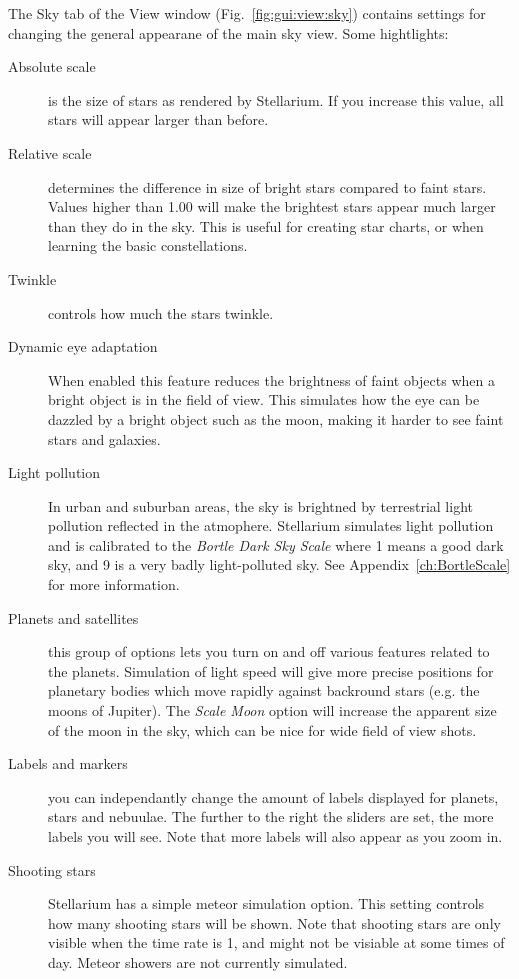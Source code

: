The Sky tab of the View window (Fig.~\ref{fig:gui:view:sky}) contains settings
for changing the general appearane of the main sky view. Some
hightlights:

\begin{description}
\item[Absolute scale] is the size of stars as rendered by
  Stellarium. If you increase this value, all stars will appear larger
  than before.
\item[Relative scale] determines the difference in size of bright
  stars compared to faint stars. Values higher than 1.00 will make the
  brightest stars appear much larger than they do in the sky. This is
  useful for creating star charts, or when learning the basic
  constellations.
\item[Twinkle] controls how much the stars twinkle.
\item[Dynamic eye adaptation] When enabled this feature reduces the
  brightness of faint objects when a bright object is in the field of
  view. This simulates how the eye can be dazzled by a bright object
  such as the moon, making it harder to see faint stars and galaxies.
\item[Light pollution] In urban and suburban areas, the sky is
  brightned by terrestrial light pollution reflected in the atmophere.
  Stellarium simulates light pollution and is calibrated to the
  \emph{Bortle Dark Sky Scale} where 1 means a good dark sky, and 9 is
  a very badly light-polluted sky. See Appendix~\ref{ch:BortleScale}
  for more information.
\item[Planets and satellites] this group of options lets you turn on
  and off various features related to the planets. Simulation of light
  speed will give more precise positions for planetary bodies which move
  rapidly against backround stars (e.g. the moons of Jupiter). The
  \emph{Scale Moon} option will increase the apparent size of the moon
  in the sky, which can be nice for wide field of view shots.
\item[Labels and markers] you can independantly change the amount of
  labels displayed for planets, stars and nebuulae. The further to the
  right the sliders are set, the more labels you will see. Note that
  more labels will also appear as you zoom in.
\item[Shooting stars] Stellarium has a simple meteor simulation
  option. This setting controls how many shooting stars will be shown.
  Note that shooting stars are only visible when the time rate is 1, and
  might not be visiable at some times of day. Meteor showers are not
  currently simulated.
\end{description}



